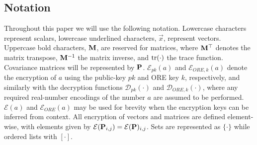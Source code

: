 \documentclass[letterpaper, 10 pt, conference]{ieeeconf}  %
\begin{document}
\subsection{Notation}
Throughout this paper we will use the following notation. Lowercase characters represent scalars, lowercase underlined characters, $\vec{x}$, represent vectors. Uppercase bold characters, ${{\mathbf{M}}}$, are reserved for matrices, where ${{\mathbf{M}}}^\top$ denotes the matrix transpose, ${{\mathbf{M}}}^{-1}$ the matrix inverse, and $\operatorname{tr}(\cdot)$ the trace function. Covariance matrices will be represented by ${{\mathbf{P}}}$. $\mathcal{E}_{pk}(a)$ and $\mathcal{E}_{ORE,k}(a)$ denote the encryption of $a$ using the public-key $pk$ and ORE key $k$, respectively, and similarly with the decryption functions $\mathcal{D}_{pk}(\cdot)$ and $\mathcal{D}_{ORE,k}(\cdot)$, where any required real-number encodings of the number $a$ are assumed to be performed. $\mathcal{E}(a)$ and $\mathcal{E}_{ORE}(a)$ may be used for brevity when the encryption keys can be inferred from context. All encryption of vectors and matrices are defined element-wise, with elements given by $\mathcal{E}({{\mathbf{P}}}_{i,j}) = \mathcal{E}({{\mathbf{P}}})_{i,j}$. Sets are represented as $\{\cdot\}$ while ordered lists with $[\cdot]$.

\end{document}

